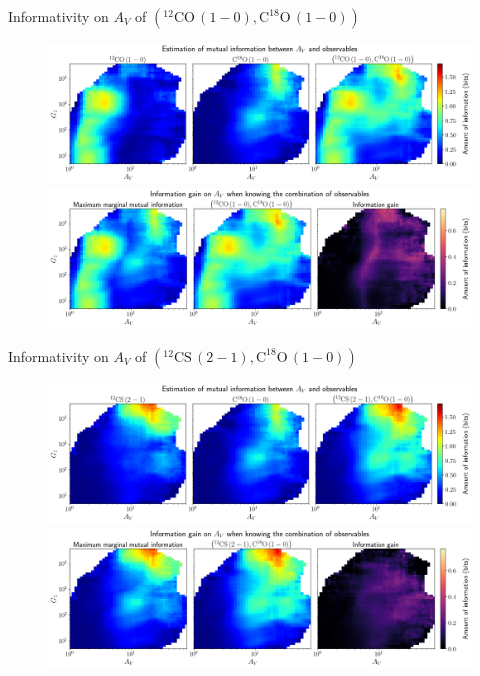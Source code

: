\documentclass{beamer}
\begin{document}
\begin{frame}{Informativity on $A_V$ of $\left(\mathrm{^{12}CO\,(1-0)},\mathrm{C^{18}O\,(1-0)}\right)$}
    \begin{figure}
        \centering
        \includegraphics[width=0.95\linewidth]{../mi/av__12co10_c18o10_mi.png}
        \vfill
        \includegraphics[width=0.95\linewidth]{../mi/av__12co10_c18o10_mi_gain.png}
    \end{figure}
\end{frame}

\begin{frame}{Informativity on $A_V$ of $\left(\mathrm{^{12}CS\,(2-1)},\mathrm{C^{18}O\,(1-0)}\right)$}
    \begin{figure}
        \centering
        \includegraphics[width=0.95\linewidth]{../mi/av__12cs21_c18o10_mi.png}
        \vfill
        \includegraphics[width=0.95\linewidth]{../mi/av__12cs21_c18o10_mi_gain.png}
    \end{figure}
\end{frame}
\end{document}
